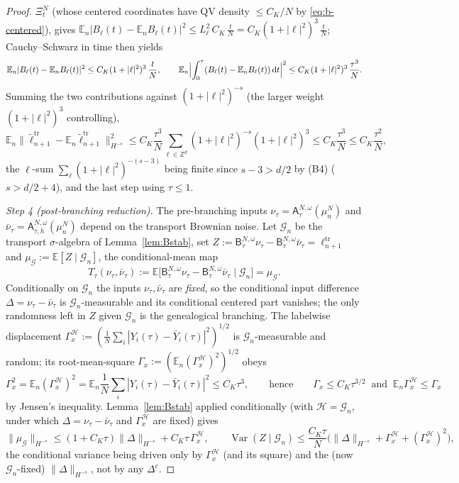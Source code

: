 \documentclass[a4paper,fleqn]{cas-sc}
\theoremstyle{definition}
\theoremstyle{remark}
\begin{document}
\begin{proof}
$\Xi^N_t$ (whose centered coordinates have QV density $\le C_K/N$ by
\eqref{eq:b-centered}), gives
$\mathbb E_n|B_\ell(t)-\mathbb E_nB_\ell(t)|^2\le L_\ell^2\,C_K\,\tfrac tN
=C_K(1+|\ell|^2)^3\,\tfrac tN$; Cauchy--Schwarz in time then yields
\[
\mathbb E_n|B_\ell(t)-\mathbb E_nB_\ell(t)|^2\le C_K(1+|\ell|^2)^3\,\frac tN,
\qquad
\mathbb E_n\Bigl|\int_0^\tau(B_\ell(t)-\mathbb E_nB_\ell(t))\,\mathrm dt\Bigr|^2
\le C_K(1+|\ell|^2)^3\,\frac{\tau^3}{N}.
\]
Summing the two contributions against $(1+|\ell|^2)^{-s}$ (the larger weight
$(1+|\ell|^2)^3$ controlling),
\[
\mathbb E_n\|\widetilde\ell^{\mathrm{tr}}_{n+1}-\mathbb E_n\widetilde\ell^{\mathrm{tr}}_{n+1}\|_{H^{-s}}^2
\le C_K\frac{\tau^3}{N}\sum_{\ell\in\mathbb Z^d}(1+|\ell|^2)^{-s}(1+|\ell|^2)^3
\le C_K\frac{\tau^3}{N}\le C_K\frac{\tau^2}{N},
\]
the $\ell$-sum $\sum_\ell(1+|\ell|^2)^{-(s-3)}$ being finite since $s-3>d/2$ by
(B4) ($s>d/2+4$), and the last step using $\tau\le1$.

\emph{Step 4 (post-branching reduction).} The pre-branching inputs
$\nu_\tau=\mathsf A^{N,\omega}_\tau(\mu^N_n)$ and
$\bar\nu_\tau=\mathsf A^{N,\omega}_{\tau,h}(\mu^N_n)$ depend on the transport
Brownian noise. Let $\mathcal G_n$ be the transport $\sigma$-algebra of
Lemma~\ref{lem:Bstab}, set $Z:=\mathsf B^{N,\omega}_\tau\nu_\tau
-\mathsf B^{N,\omega}_\tau\bar\nu_\tau=\ell^{\mathrm{tr}}_{n+1}$ and
$\mu_{\mathcal G}:=\mathbb E[Z\mid\mathcal G_n]$, the conditional-mean map
\[
T_\tau(\nu_\tau,\bar\nu_\tau):=\mathbb E\bigl[\mathsf B^{N,\omega}_\tau\nu_\tau
-\mathsf B^{N,\omega}_\tau\bar\nu_\tau\mid\mathcal G_n\bigr]=\mu_{\mathcal G}.
\]
Conditionally on $\mathcal G_n$ the inputs $\nu_\tau,\bar\nu_\tau$ are \emph{fixed},
so the conditional input difference $\Delta=\nu_\tau-\bar\nu_\tau$ is
$\mathcal G_n$-measurable and its conditional centered part vanishes; the only
randomness left in $Z$ given $\mathcal G_n$ is the genealogical branching. The
labelwise displacement $\Gamma_x^{\mathcal H}:=(\frac1N\sum_i|Y_i(\tau)-\bar Y_i(\tau)|^2)^{1/2}$
is $\mathcal G_n$-measurable and random; its root-mean-square
$\Gamma_x:=(\mathbb E_n(\Gamma_x^{\mathcal H})^2)^{1/2}$ obeys
\begin{equation}\label{eq:Gamma-bound}
\Gamma_x^2=\mathbb E_n(\Gamma_x^{\mathcal H})^2=\mathbb E_n\frac1N\sum_i|Y_i(\tau)-\bar Y_i(\tau)|^2\le C_K\tau^3,
\qquad\text{hence}\qquad \Gamma_x\le C_K\tau^{3/2}\ \text{ and }\ \mathbb E_n\Gamma_x^{\mathcal H}\le\Gamma_x
\end{equation}
by Jensen's inequality.
Lemma~\ref{lem:Bstab} applied conditionally (with $\mathcal H=\mathcal G_n$, under
which $\Delta=\nu_\tau-\bar\nu_\tau$ and $\Gamma_x^{\mathcal H}$ are fixed) gives
\[
\|\mu_{\mathcal G}\|_{H^{-s}}\le(1+C_K\tau)\|\Delta\|_{H^{-s}}+C_K\tau\,\Gamma_x^{\mathcal H},
\qquad
\operatorname{Var}(Z\mid\mathcal G_n)\le\frac{C_K\tau}{N}\bigl(\|\Delta\|_{H^{-s}}+\Gamma_x^{\mathcal H}+(\Gamma_x^{\mathcal H})^2\bigr),
\]
the conditional variance being driven only by $\Gamma_x^{\mathcal H}$ (and its square)
and the (now $\mathcal G_n$-fixed) $\|\Delta\|_{H^{-s}}$, not by any $\Delta^c$.


\end{proof}
\end{document}
